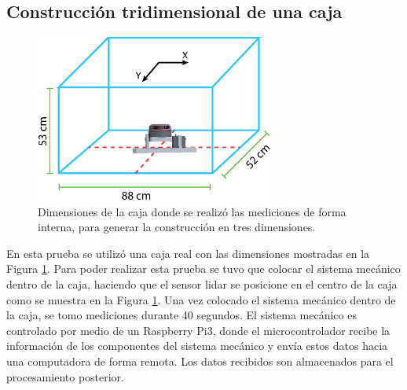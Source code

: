 
\subsection{Construcción tridimensional de una caja}
\label{sec:MapaCaja}
\begin{figure}
  \centering \footnotesize
  \includegraphics[width=0.70\textwidth]{images/3DLidar.eps}
  \captionsetup{font=footnotesize}
  \caption{Dimensiones de la caja donde se realizó las mediciones de forma interna, para
  generar la construcción en tres dimensiones.}
  \label{fig:dim_cajaReal}
\end{figure}

En esta prueba se utilizó una caja real con las dimensiones mostradas en 
la Figura \ref{fig:dim_cajaReal}. Para poder realizar esta prueba se tuvo que
colocar el sistema mecánico dentro de la caja, haciendo que el sensor lidar 
se posicione en el centro de la caja como se muestra en la Figura 
\ref{fig:dim_cajaReal}. Una vez colocado el sistema mecánico dentro de la caja, se 
tomo mediciones durante 40 segundos. El sistema mecánico es controlado por
medio de un Raspberry Pi3, donde el microcontrolador recibe la información 
de los componentes del sistema mecánico y envía estos datos hacia una computadora
de forma remota. Los datos recibidos son almacenados para el procesamiento posterior.

